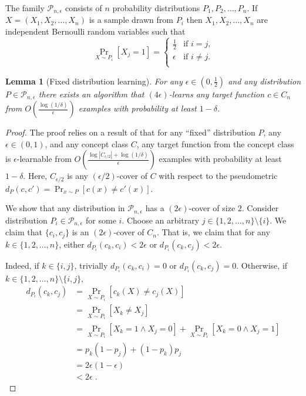 \documentclass[12pt]{article}
\newtheorem{lemma}[proposition]{Lemma}
\renewcommand{\P}{\mathcal{P}}
\begin{document}
The family $\P_{n,\epsilon}$ consists of $n$ probability distributions $P_1, P_2, \dots, P_n$.
If $X = (X_1, X_2, \dots, X_n)$ is a sample drawn from $P_i$ then $X_1, X_2, \dots, X_n$
are independent Bernoulli random variables such that
$$
\Pr_{X \sim P_i}[X_j = 1] =
\begin{cases}
\frac{1}{2} & \text{if $i = j$,} \\
\epsilon & \text{if $i \neq j$.} \\
\end{cases}
$$

\begin{lemma}[Fixed distribution learning]
For any $\epsilon \in (0,\frac{1}{2})$ and any distribution $P \in
\P_{n,\epsilon}$ there exists an algorithm that $(4\epsilon)$-learns any target
function $c \in C_n$ from $O \left( \frac{\log(1/\delta)}{\epsilon} \right)$
examples with probability at least $1 - \delta$.
\end{lemma}

\begin{proof}
The proof relies on a result of \cite{Benedek-Itai-1991} that for any ``fixed''
distribution $P$, any $\epsilon \in (0,1)$, and any concept class $C$, any
target function from the concept class is $\epsilon$-learnable from $O \left(
\frac{\log |C_{\epsilon/2}| + \log (1/\delta)}{\epsilon}\right)$ examples with
probability at least $1-\delta$. Here, $C_{\epsilon/2}$ is any
$(\epsilon/2)$-cover of $C$ with respect to the pseudometric $d_P(c,c') = \Pr_{x
\sim P}[c(x) \neq c'(x)]$.

We show that any distribution in $\P_{n,\epsilon}$ has a $(2\epsilon)$-cover of
size $2$. Consider distribution $P_i \in \P_{n,\epsilon}$ for some $i$. Choose
an arbitrary $j \in \{1,2,\dots,n\} \setminus \{i\}$. We claim that $\{c_i,
c_j\}$ is an $(2\epsilon)$-cover of $C_n$. That is, we claim that for any $k \in
\{1,2,\dots,n\}$, either $d_{P_i}(c_k,c_i) < 2\epsilon$ or $d_{P_i}(c_k,c_j) <
2\epsilon$.

Indeed, if $k \in \{i,j\}$, trivially $d_{P_i}(c_k,c_i) = 0$ or $d_{P_i}(c_k,c_j) = 0$.
Otherwise, if  $k \in \{1,2,\dots,n\} \setminus \{i,j\}$,
\begin{align*}
d_{P_i}(c_k, c_j)
& = \Pr_{X \sim P_i}[c_k(X) \neq c_j(X)] \\
& = \Pr_{X \sim P_i}[X_k \neq X_j] \\
& = \Pr_{X \sim P_i}[X_k = 1 \wedge X_j = 0] + \Pr_{X \sim P_i}[X_k = 0 \wedge X_j = 1] \\
& = p_k(1 - p_j) + (1 - p_k) p_j \\
& = 2 \epsilon (1-\epsilon) \\
& < 2 \epsilon \; .
\end{align*}
\end{proof}
\end{document}
